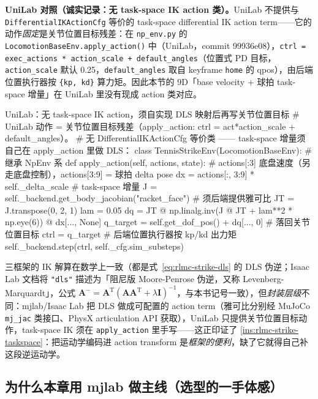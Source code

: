 \textbf{UniLab 对照（诚实记录：无 task-space IK action 类）。}UniLab 不提供与 \verb|DifferentialIKActionCfg| 等价的 task-space differential IK action term——它的动作\emph{固定}是关节位置目标残差：在 \verb|np_env.py| 的 \verb|LocomotionBaseEnv.apply_action()| 中（UniLab，commit 99936e08），\verb|ctrl = exec_actions * action_scale + default_angles|（位置式 PD 目标，\verb|action_scale| 默认 0.25，\verb|default_angles| 取自 keyframe \verb|home| 的 qpos），由后端位置执行器按 \verb|{kp, kd}| 算力矩。因此本节的 9D「base velocity $+$ 球拍 task-space 增量」在 UniLab 里没有现成 action 类对应。

\begin{codebox}[Python]{UniLab：无 task-space IK action，须自实现 DLS 映射后再写关节位置目标}
# UniLab 动作 = 关节位置目标残差（apply_action: ctrl = act*action_scale + default_angles）。
# 无 DifferentialIKActionCfg 等价类 —— task-space 增量须自己在 apply_action 里做 DLS：
class TennisStrikeEnv(LocomotionBaseEnv):       # 继承 NpEnv 系
    def apply_action(self, actions, state):
        # actions[:3] 底盘速度（另走底盘控制），actions[3:9] = 球拍 delta pose
        dx = actions[:, 3:9] * self._delta_scale            # task-space 增量
        J = self._backend.get_body_jacobian("racket_face")  # 须后端提供雅可比
        JT = J.transpose(0, 2, 1)
        lam = 0.05
        dq = JT @ np.linalg.inv(J @ JT + lam**2 * np.eye(6)) @ dx[..., None]
        q_target = self.get_dof_pos() + dq[..., 0]          # 落回关节位置目标
        ctrl = q_target                                     # 后端位置执行器按 kp/kd 出力矩
        self._backend.step(ctrl, self._cfg.sim_substeps)
\end{codebox}

\noindent{}三框架的 IK 解算在数学上一致（都是式~\eqref{eq:rlmc-strike-dls} 的 DLS 伪逆；Isaac Lab 文档将 \verb|"dls"| 描述为「阻尼版 Moore-Penrose 伪逆，又称 Levenberg-Marquardt」，公式 $\mathbf{A}^{-}=\mathbf{A}^{\mathrm{T}}(\mathbf{A}\mathbf{A}^{\mathrm{T}}+\lambda\mathbf{I})^{-1}$，与本书记号一致），但\emph{封装层级}不同：mjlab/Isaac Lab 把 DLS 做成可配置的 action term（雅可比分别经 MuJoCo \verb|mj_jac| 类接口、PhysX articulation API 获取），UniLab 只提供关节位置目标动作，task-space IK 须在 \verb|apply_action| 里手写——这正印证了 \cref{ins:rlmc-strike-taskspace}：把运动学编码进 action transform 是\emph{框架的便利}，缺了它就得自己补这段逆运动学。

\subsection{为什么本章用 mjlab 做主线（选型的一手体感）}
\label{sec:rlmc-strike-mjlab-mainline}

